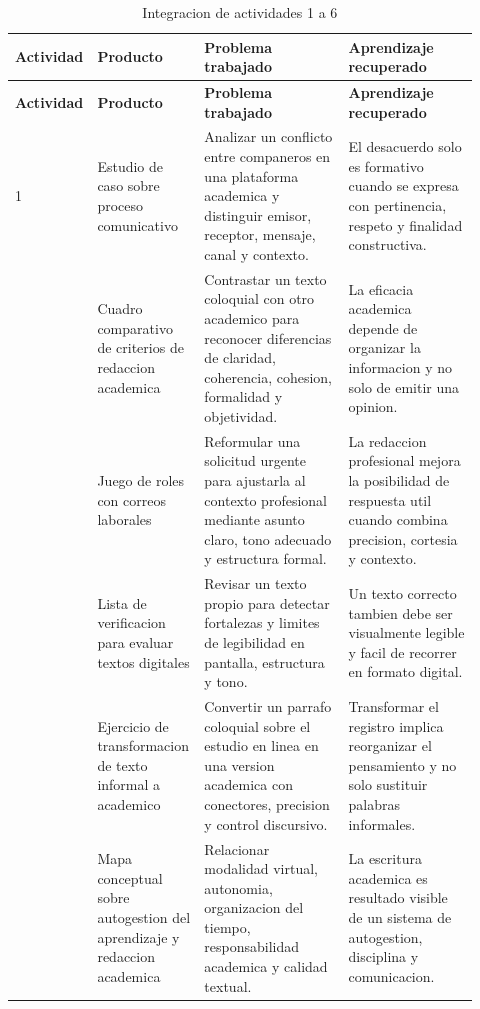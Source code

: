 \documentclass[
	spanish,
	letterpaper, oneside
]{article}
\begin{document}
\begin{longtable}{@{}p{0.10\linewidth}p{0.23\linewidth}p{0.31\linewidth}p{0.28\linewidth}@{}}
\caption{Integracion de actividades 1 a 6}\label{tab:portafolio-evidencias}\\
\toprule
\textbf{Actividad} & \textbf{Producto} & \textbf{Problema trabajado} & \textbf{Aprendizaje recuperado} \\
\midrule
\endfirsthead
\toprule
\textbf{Actividad} & \textbf{Producto} & \textbf{Problema trabajado} & \textbf{Aprendizaje recuperado} \\
\midrule
\endhead
1 & Estudio de caso sobre proceso comunicativo & Analizar un conflicto entre companeros en una plataforma academica y distinguir emisor, receptor, mensaje, canal y contexto. & El desacuerdo solo es formativo cuando se expresa con pertinencia, respeto y finalidad constructiva. \\
\addlinespace
2 & Cuadro comparativo de criterios de redaccion academica & Contrastar un texto coloquial con otro academico para reconocer diferencias de claridad, coherencia, cohesion, formalidad y objetividad. & La eficacia academica depende de organizar la informacion y no solo de emitir una opinion. \\
\addlinespace
3 & Juego de roles con correos laborales & Reformular una solicitud urgente para ajustarla al contexto profesional mediante asunto claro, tono adecuado y estructura formal. & La redaccion profesional mejora la posibilidad de respuesta util cuando combina precision, cortesia y contexto. \\
\addlinespace
4 & Lista de verificacion para evaluar textos digitales & Revisar un texto propio para detectar fortalezas y limites de legibilidad en pantalla, estructura y tono. & Un texto correcto tambien debe ser visualmente legible y facil de recorrer en formato digital. \\
\addlinespace
5 & Ejercicio de transformacion de texto informal a academico & Convertir un parrafo coloquial sobre el estudio en linea en una version academica con conectores, precision y control discursivo. & Transformar el registro implica reorganizar el pensamiento y no solo sustituir palabras informales. \\
\addlinespace
6 & Mapa conceptual sobre autogestion del aprendizaje y redaccion academica & Relacionar modalidad virtual, autonomia, organizacion del tiempo, responsabilidad academica y calidad textual. & La escritura academica es resultado visible de un sistema de autogestion, disciplina y comunicacion. \\
\bottomrule
\end{longtable}
\endgroup
\end{document}
